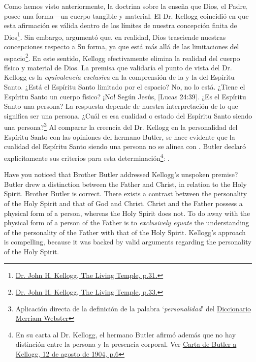 Como hemos visto anteriormente, la doctrina sobre la  enseña que Dios, el Padre, posee una forma—un cuerpo tangible y material. El Dr. Kellogg coincidió en que esta afirmación es válida dentro de los límites de nuestra concepción finita de Dios\footnote{\href{https://archive.org/details/J.H.Kellogg.TheLivingTemple1903/page/n33/}{Dr. John H. Kellogg, The Living Temple, p.31.}}. Sin embargo, argumentó que, en realidad, Dios trasciende nuestras concepciones respecto a Su forma, ya que está más allá de las limitaciones del espacio\footnote{\href{https://archive.org/details/J.H.Kellogg.TheLivingTemple1903/page/n33/}{Dr. John H. Kellogg, The Living Temple, p.33.}}. En este sentido, Kellogg efectivamente elimina la realidad del cuerpo físico y material de Dios. La premisa que validaría el punto de vista del Dr. Kellogg es la \textit{equivalencia exclusiva} en la comprensión de la  y la del Espíritu Santo. ¿Está el Espíritu Santo limitado por el espacio? No, no lo está. ¿Tiene el Espíritu Santo un cuerpo físico? ¡No! Según Jesús, [Lucas 24:39]. ¿Es el Espíritu Santo una persona? La respuesta depende de nuestra interpretación de lo que significa ser una persona. ¿Cuál es esa cualidad o estado del Espíritu Santo siendo una persona?\footnote{Aplicación directa de la definición de la palabra ‘\textit{personalidad}’ del \href{https://www.merriam-webster.com/dictionary/personality}{Diccionario Merriam Webster}} Al comparar la creencia del Dr. Kellogg en la personalidad del Espíritu Santo con las opiniones del hermano Butler, se hace evidente que la cualidad del Espíritu Santo siendo una persona no se alinea con . Butler declaró explícitamente sus criterios para esta determinación\footnote{En su carta al Dr. Kellogg, el hermano Butler afirmó además que no hay distinción entre la persona y la presencia corporal. Ver \href{https://c7da.us/egwdl/Butler\%20to\%20Kellogg\%20Aug121904.pdf}{Carta de Butler a Kellogg, 12 de agosto de 1904, p.6}}: .


Have you noticed that Brother Butler addressed Kellogg’s unspoken premise? Butler drew a distinction between the Father and Christ, in relation to the Holy Spirit. Brother Butler is correct. There exists a contrast between the personality of the Holy Spirit and that of God and Christ. Christ and the Father possess a physical form of a person, whereas the Holy Spirit does not. To do away with the physical form of a person of the Father is to \textit{exclusively equate} the understanding of the personality of the Father with that of the Holy Spirit. Kellogg’s approach is compelling, because it was backed by valid arguments regarding the personality of the Holy Spirit.


